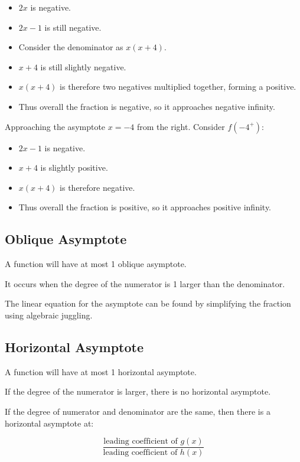 \documentclass[a4paper,11pt]{article}
\begin{document}
\begin{itemize}
\item $2x$ is negative.
\item $2x - 1$ is still negative.
\item Consider the denominator as $x(x + 4)$.
\item $x + 4$ is still slightly negative.
\item $x(x + 4)$ is therefore two negatives multiplied together, forming a
	positive.
\item Thus overall the fraction is negative, so it approaches negative infinity.
\end{itemize}

Approaching the asymptote $x = -4$ from the right. Consider $f(-4^+)$:

\begin{itemize}
\item $2x - 1$ is negative.
\item $x + 4$ is slightly positive.
\item $x(x + 4)$ is therefore negative.
\item Thus overall the fraction is positive, so it approaches positive infinity.
\end{itemize}


\subsection{Oblique Asymptote}

A function will have at most 1 oblique asymptote.

It occurs when the degree of the numerator is 1 larger than the denominator.

The linear equation for the asymptote can be found by simplifying the fraction
using algebraic juggling.


\subsection{Horizontal Asymptote}

A function will have at most 1 horizontal asymptote.

If the degree of the numerator is larger, there is no horizontal asymptote.

If the degree of numerator and denominator are the same, then there is a
horizontal asymptote at:

$$
\frac{\text{leading coefficient of $g(x)$}}{\text{leading coefficient of $h(x)$}}
$$
\end{document}
